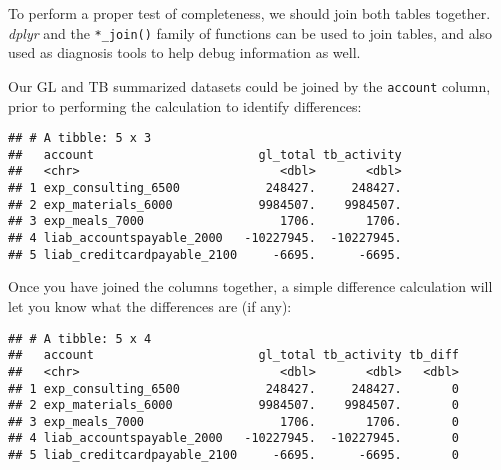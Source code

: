 \documentclass[
]{book}
\newenvironment{Shaded}{\begin{snugshade}}{\end{snugshade}}
\newcommand{\DataTypeTok}[1]{\textcolor[rgb]{0.13,0.29,0.53}{#1}}
\newcommand{\KeywordTok}[1]{\textcolor[rgb]{0.13,0.29,0.53}{\textbf{#1}}}
\newcommand{\NormalTok}[1]{#1}
\newcommand{\OperatorTok}[1]{\textcolor[rgb]{0.81,0.36,0.00}{\textbf{#1}}}
\newcommand{\StringTok}[1]{\textcolor[rgb]{0.31,0.60,0.02}{#1}}
\begin{document}
To perform a proper test of completeness, we should join both tables together. \emph{dplyr} and the \texttt{*\_join()} family of functions can be used to join tables, and also used as diagnosis tools to help debug information as well.

Our GL and TB summarized datasets could be joined by the \texttt{account} column, prior to performing the calculation to identify differences:

\begin{Shaded}
\end{Shaded}

\begin{verbatim}
## # A tibble: 5 x 3
##   account                       gl_total tb_activity
##   <chr>                            <dbl>       <dbl>
## 1 exp_consulting_6500            248427.     248427.
## 2 exp_materials_6000            9984507.    9984507.
## 3 exp_meals_7000                   1706.       1706.
## 4 liab_accountspayable_2000   -10227945.  -10227945.
## 5 liab_creditcardpayable_2100     -6695.      -6695.
\end{verbatim}

Once you have joined the columns together, a simple difference calculation will let you know what the differences are (if any):

\begin{Shaded}
\end{Shaded}

\begin{verbatim}
## # A tibble: 5 x 4
##   account                       gl_total tb_activity tb_diff
##   <chr>                            <dbl>       <dbl>   <dbl>
## 1 exp_consulting_6500            248427.     248427.       0
## 2 exp_materials_6000            9984507.    9984507.       0
## 3 exp_meals_7000                   1706.       1706.       0
## 4 liab_accountspayable_2000   -10227945.  -10227945.       0
## 5 liab_creditcardpayable_2100     -6695.      -6695.       0
\end{verbatim}
\end{document}
